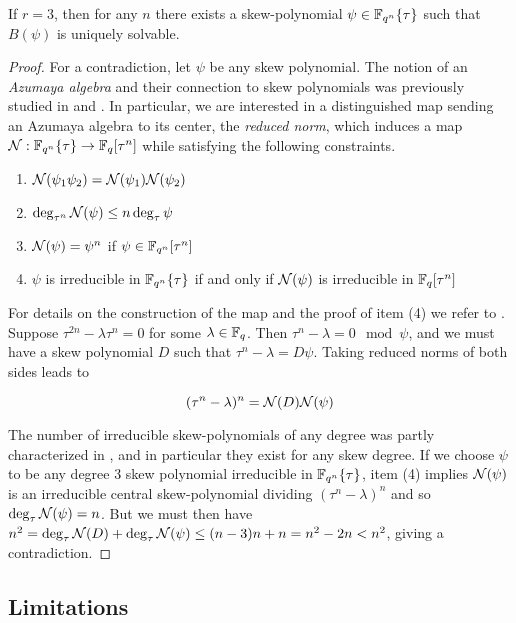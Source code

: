 \begin{prop}\label{rank3}
If $r = 3$, then for any $n$ there exists a skew-polynomial $\psi \in \mathbb{F}_{q^n}\{\tau\}$ such that $B(\psi)$ is uniquely solvable.
\end{prop}
\begin{proof}
For a contradiction, let $\psi$ be any skew polynomial. The notion of an \textit{Azumaya algebra} and their connection to skew polynomials was previously studied in \cite{Ikehata1984AzumayaAA} and \cite{skewfactor}. In particular, we are interested in a distinguished map sending an Azumaya algebra to its center, the \textit{reduced norm}, which induces a map $\mathcal{N}: \mathbb{F}_{q^n}\{\tau\} \to \mathbb{F}_q[\tau^n]$ while satisfying the following constraints.

\begin{enumerate}
    \item $\mathcal{N}(\psi_1 \psi_2) = \mathcal{N}(\psi_1) \mathcal{N}(\psi_2)$
    \item $\deg_{\tau^n} \mathcal{N}(\psi) \leq n \deg_{\tau} \psi$
    \item $\mathcal{N}(\psi) = \psi^n$ if $\psi \in \mathbb{F}_{q^n}[\tau^n]$
    \item $\psi$ is irreducible in $\mathbb{F}_{q^n}\{\tau\}$ if and only if $\mathcal{N}(\psi)$ is irreducible in $\mathbb{F}_q[\tau^n]$
\end{enumerate}

For details on the construction of the map and the proof of item (4) we refer to \cite[Prop. 2.1.17]{skewfactor}. Suppose $\tau^{2n} - \lambda \tau^n = 0$ for some $\lambda \in \mathbb{F}_q$. Then $\tau^{n} - \lambda = 0 \mod \psi$, and we must have a skew polynomial $D$ such that $\tau^n - \lambda = D \psi$. Taking reduced norms of both sides leads to

\begin{equation*}
(\tau^n - \lambda)^n = \mathcal{N}(D)\mathcal{N}(\psi)
\end{equation*}

The number of irreducible skew-polynomials of any degree was partly characterized in \cite{odoni_1999}, and in particular they exist for any skew degree. If we choose $\psi$ to be any degree 3 skew polynomial irreducible in $\mathbb{F}_{q^n}\{\tau \}$, item (4) implies $\mathcal{N}(\psi)$ is an irreducible central skew-polynomial dividing $(\tau^n - \lambda)^n$ and so $\deg_{\tau}\mathcal{N}(\psi) = n$. But we must then have $n^2 = \deg_{\tau} \mathcal{N}(D) + \deg_{\tau} \mathcal{N}(\psi) \leq (n-3)n + n = n^2 - 2n < n^2$, giving a contradiction.

\end{proof}

\subsection{Limitations}

